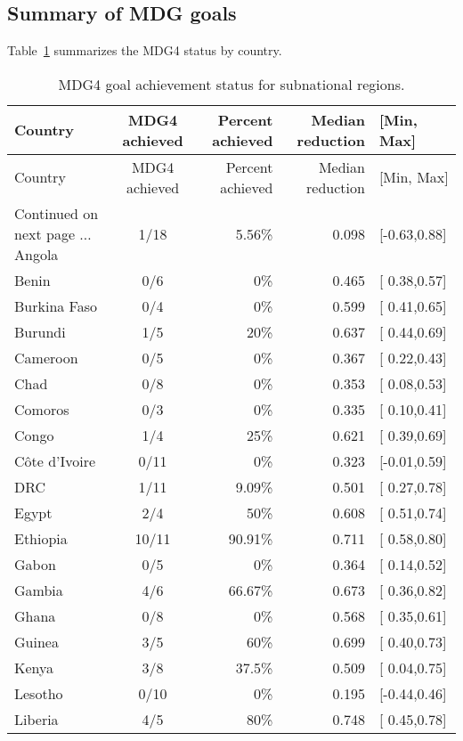 \documentclass[12pt]{article}\usepackage[]{graphicx}\usepackage[]{color}
\begin{document}
\subsection{Summary of MDG goals}
Table~\ref{tab:mdg} summarizes the MDG4 status by country.
\begin{longtable}{lcrrl}
\caption{MDG4 goal achievement status for subnational regions.} \label{tab:mdg} \\
\toprule
Country & MDG4 achieved & Percent achieved & Median reduction & [Min, Max] \\ 
\midrule
\endfirsthead
\toprule
Country & MDG4 achieved & Percent achieved & Median reduction & [Min, Max] \\ 
\midrule
\endhead
{\footnotesize Continued on next page $\dots$}
\endfoot
\endlastfoot
Angola & 1/18 & 5.56\% & 0.098 & [-0.63,0.88] \\ 
  Benin & 0/6 & 0\% & 0.465 & [ 0.38,0.57] \\ 
  Burkina Faso & 0/4 & 0\% & 0.599 & [ 0.41,0.65] \\ 
  Burundi & 1/5 & 20\% & 0.637 & [ 0.44,0.69] \\ 
  Cameroon & 0/5 & 0\% & 0.367 & [ 0.22,0.43] \\ 
  Chad & 0/8 & 0\% & 0.353 & [ 0.08,0.53] \\ 
  Comoros & 0/3 & 0\% & 0.335 & [ 0.10,0.41] \\ 
  Congo & 1/4 & 25\% & 0.621 & [ 0.39,0.69] \\ 
  C\^{o}te d'Ivoire & 0/11 & 0\% & 0.323 & [-0.01,0.59] \\ 
  DRC & 1/11 & 9.09\% & 0.501 & [ 0.27,0.78] \\ 
  Egypt & 2/4 & 50\% & 0.608 & [ 0.51,0.74] \\ 
  Ethiopia & 10/11 & 90.91\% & 0.711 & [ 0.58,0.80] \\ 
  Gabon & 0/5 & 0\% & 0.364 & [ 0.14,0.52] \\ 
  Gambia & 4/6 & 66.67\% & 0.673 & [ 0.36,0.82] \\ 
  Ghana & 0/8 & 0\% & 0.568 & [ 0.35,0.61] \\ 
  Guinea & 3/5 & 60\% & 0.699 & [ 0.40,0.73] \\ 
  Kenya & 3/8 & 37.5\% & 0.509 & [ 0.04,0.75] \\ 
  Lesotho & 0/10 & 0\% & 0.195 & [-0.44,0.46] \\ 
  Liberia & 4/5 & 80\% & 0.748 & [ 0.45,0.78] \\ 

\end{longtable}
\end{document}
